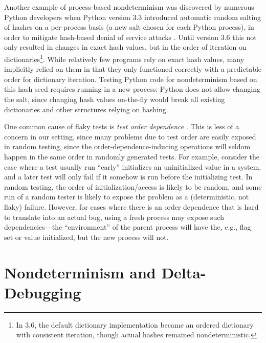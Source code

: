 Another example of process-based nondeterminism was discovered by numerous Python developers when Python
version 3.3 introduced automatic random salting of hashes on a
per-process basis (a new salt chosen for each Python process),
in order to mitigate hash-based denial of service attacks
\cite{denial}.  Until version 3.6 this not only resulted in changes in
exact hash values, but in the order of iteration on
dictionaries\footnote{In 3.6, the default dictionary
  implementation became an ordered dictionary with consistent
  iteration, though actual hashes remained nondeterministic.}.  While
relatively few programs rely on exact hash values, many implicitly
relied on them in that they only functioned correctly with a
predictable order for dictionary iteration.  Testing
Python code for nondeterminism based on this hash seed requires
running in a new process:  Python does not allow changing the salt, since changing hash values on-the-fly would
break all existing dictionaries and other structures relying on
hashing.


One common cause of flaky tests is \emph{test order dependence} \cite{idflakies}.  This
is less of a concern in our setting, since many problems due to test
order are easily exposed in random testing, since the
order-dependence-inducing operations will seldom happen in the
same order in randomly generated tests.  For example, consider the
case where a test usually run ``early'' initializes an uninitialized
value in a system, and a later test will only fail if it somehow is
run before the initializing test.  In random testing, the order of
initialization/access is likely to be random, and some run of a random
tester is likely to expose the problem as a (deterministic, not flaky) failure.
However, for cases where
there is an order dependence that is hard to translate into an
actual bug, using a fresh
process may expose such dependencies---the ``environment'' of the
parent process will have the, e.g., flag set or value initialized, but
the new process will not.

\section{Nondeterminism and Delta-Debugging}


